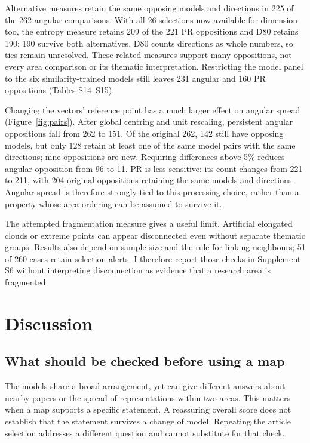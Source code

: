 \documentclass[12pt]{article}
\begin{document}
Alternative measures retain the same opposing models and directions in 225 of the 262 angular comparisons. With all 26 selections now available for dimension too, the entropy measure retains 209 of the 221 PR oppositions and D80 retains 190; 190 survive both alternatives. D80 counts directions as whole numbers, so ties remain unresolved. These related measures support many oppositions, not every area comparison or its thematic interpretation. Restricting the model panel to the six similarity-trained models still leaves 231 angular and 160 PR oppositions (Tables S14--S15).

Changing the vectors' reference point has a much larger effect on angular spread (Figure~\ref{fig:pairs}). After global centring and unit rescaling, persistent angular oppositions fall from 262 to 151. Of the original 262, 142 still have opposing models, but only 128 retain at least one of the same model pairs with the same directions; nine oppositions are new. Requiring differences above 5\% reduces angular opposition from 96 to 11. PR is less sensitive: its count changes from 221 to 211, with 204 original oppositions retaining the same models and directions. Angular spread is therefore strongly tied to this processing choice, rather than a property whose area ordering can be assumed to survive it.

The attempted fragmentation measure gives a useful limit. Artificial elongated clouds or extreme points can appear disconnected even without separate thematic groups. Results also depend on sample size and the rule for linking neighbours; 51 of 260 cases retain selection alerts. I therefore report those checks in Supplement S6 without interpreting disconnection as evidence that a research area is fragmented.

\FloatBarrier
\section{Discussion}
\subsection{What should be checked before using a map}
The models share a broad arrangement, yet can give different answers about nearby papers or the spread of representations within two areas. This matters when a map supports a specific statement. A reassuring overall score does not establish that the statement survives a change of model. Repeating the article selection addresses a different question and cannot substitute for that check.
\end{document}
